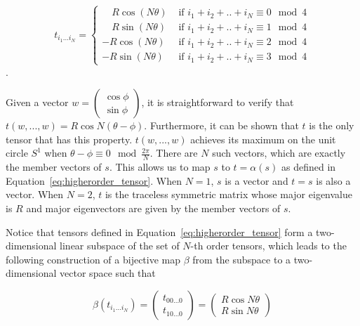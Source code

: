 \documentclass{acmsiggraph}               %
\begin{document}
\begin{equation}
t_{i_1 ... i_N} = \left\{ \begin{array}{ll} \quad R\cos(N\theta) & \textrm{ if $i_1+i_2+..+i_N \equiv 0 \mod 4$} \\
\quad R\sin(N\theta) & \textrm{ if $i_1+i_2+..+i_N \equiv 1 \mod 4$}
\\ -R\cos(N\theta) & \textrm{ if $i_1+i_2+..+i_N \equiv 2 \mod 4$} \\
-R\sin(N\theta) & \textrm{ if $i_1+i_2+..+i_N \equiv 3 \mod 4$}
\end{array} \right.  \label{eq:higherorder_tensor}
\end{equation}.

Given a vector $w=\begin{pmatrix} \cos\phi \\ \sin\phi
\end{pmatrix}$, it is straightforward to verify that $t(w, ..., w) =
R\cos N(\theta-\phi)$. Furthermore, it can be shown that $t$ is the
only tensor that has this property. $t(w, ..., w)$ achieves its
maximum on the unit circle $S^1$ when $\theta - \phi \equiv 0 \mod
\frac{2\pi}{N}$. There are $N$ such vectors, which are exactly the
member vectors of $s$. This allows us to map $s$ to $t=\alpha(s)$ as
defined in Equation~\ref{eq:higherorder_tensor}.
When $N=1$, $s$ is a vector and $t=s$ is also a vector. When $N=2$,
$t$ is the traceless symmetric matrix whose major eigenvalue is $R$
and major eigenvectors are given by the member vectors of $s$.


Notice that tensors defined in Equation~\ref{eq:higherorder_tensor}
form a two-dimensional linear subspace of the set of $N$-th order
tensors, which leads to the following construction of a bijective
map $\beta$ from the subspace to a two-dimensional vector space such
that

\begin{equation}
\beta(t_{i_1 ... i_N}) = \begin{pmatrix} t_{0 0 ... 0} \\ t_{1 0 ...
0} \end{pmatrix} = \begin{pmatrix} R\cos N\theta \\ R\sin N\theta
\end{pmatrix}
\end{equation}
\end{document}
